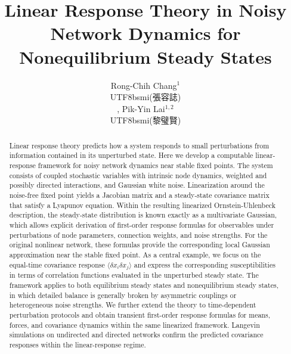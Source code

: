 \documentclass[aps,pre,preprint,groupedaddress]{revtex4}
\begin{document}
\title{Linear Response Theory in Noisy Network Dynamics for Nonequilibrium Steady States}
\author{Rong-Chih Chang$^1$\begin{CJK*}{UTF8}{bsmi}(張容誌)\end{CJK*}, Pik-Yin Lai$^{1,2}$%
\begin{CJK*}{UTF8}{bsmi}(黎璧賢)\end{CJK*}}

\begin{abstract}
    Linear response theory predicts how a system responds to small perturbations from information contained in its unperturbed state. Here we develop a computable linear-response framework for noisy network dynamics near stable fixed points. The system consists of coupled stochastic variables with intrinsic node dynamics, weighted and possibly directed interactions, and Gaussian white noise. Linearization around the noise-free fixed point yields a Jacobian matrix and a steady-state covariance matrix that satisfy a Lyapunov equation. Within the resulting linearized Ornstein-Uhlenbeck description, the steady-state distribution is known exactly as a multivariate Gaussian, which allows explicit derivation of first-order response formulas for observables under perturbations of node parameters, connection weights, and noise strengths. For the original nonlinear network, these formulas provide the corresponding local Gaussian approximation near the stable fixed point. As a central example, we focus on the equal-time covariance response $\langle \delta x_i \delta x_j \rangle$ and express the corresponding susceptibilities in terms of correlation functions evaluated in the unperturbed steady state. The framework applies to both equilibrium steady states and nonequilibrium steady states, in which detailed balance is generally broken by asymmetric couplings or heterogeneous noise strengths. We further extend the theory to time-dependent perturbation protocols and obtain transient first-order response formulas for means, forces, and covariance dynamics within the same linearized framework. Langevin simulations on undirected and directed networks confirm the predicted covariance responses within the linear-response regime.
\end{abstract}

\maketitle








\appendix







\end{document}
